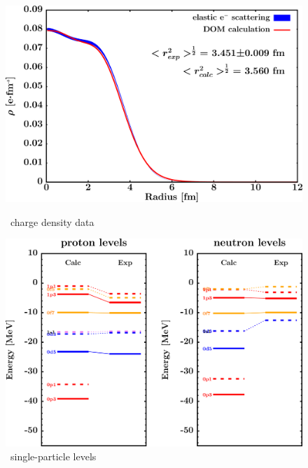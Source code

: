 \begin{figure}[H]
    \centering
    \begin{minipage}{0.45\textwidth}
        \centering
        \includegraphics[width=1.0\textwidth]{figures/ca48_chargeDensity.png}
        \caption{\caEight\ charge density data}
        \label{DOMFitData_ca48_chargeDensity}
    \end{minipage}\hfill
    \begin{minipage}{0.45\textwidth}
        \centering
        \includegraphics[width=1.0\textwidth]{figures/ca48_SPLevels.png}
        \caption{\caEight\ single-particle levels}
        \label{DOMFitData_ca48_SPLevels}
    \end{minipage}
\end{figure}

\afterpage{\clearpage}

